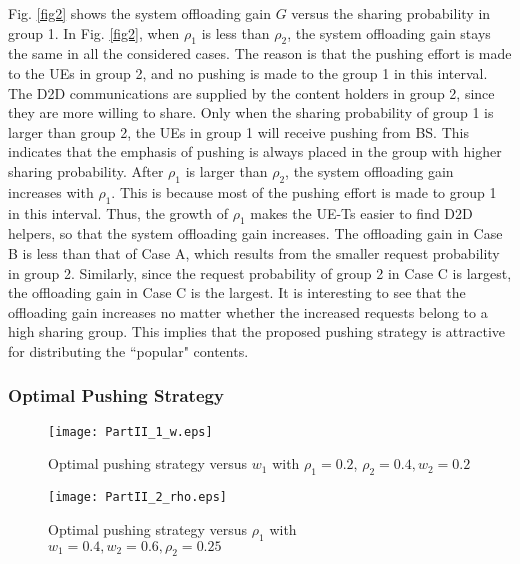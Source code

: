 \documentclass[12pt, draftclsnofoot, onecolumn]{IEEEtran}
\begin{document}
Fig. \ref{fig2} shows the system offloading gain $G$ versus the sharing probability in group 1. In Fig. \ref{fig2}, when $\rho_1$ is less than $\rho_2$, the system offloading gain stays the same in all the considered cases. The reason is that the pushing effort is made to the UEs in group 2, and no pushing is made to the group 1 in this interval. The D2D communications are supplied by the content holders in group 2, since they are more willing to share. Only when the sharing probability of group 1 is larger than group 2, the UEs in group 1 will receive pushing from BS. This indicates that the emphasis of pushing is always placed in the group with higher sharing probability. After $\rho_1$ is larger than $\rho_2$, the system offloading gain increases with $\rho_1$. This is because most of the pushing effort is made to group 1 in this interval. Thus, the growth of $\rho_1$ makes the UE-Ts easier to find D2D helpers, so that the system offloading gain increases.
The offloading gain in Case B is less than that of Case A, which results from the smaller request probability in group 2. Similarly, since the request probability of group 2 in Case C is largest, the offloading gain in Case C is the largest. It is interesting to see that the offloading gain increases no matter whether the increased requests belong to a high sharing group. This implies that the proposed pushing strategy is attractive for distributing the ``popular" contents.

\subsubsection{Optimal Pushing Strategy}

\begin{figure}
\begin{minipage}[t]{0.5\textwidth}
\centering
\texttt{[image: PartII\_1\_w.eps]}
\caption{Optimal pushing strategy versus $w_1$ with $\rho_1\!\!=\!\!0.2$,  $\rho_2 = 0.4,w_2 = 0.2$}
\label{fig3}
\end{minipage}
\begin{minipage}[t]{0.5\textwidth}
\centering
\texttt{[image: PartII\_2\_rho.eps]}
\caption{Optimal pushing strategy versus $\rho_1$ with $w_1=0.4,w_2 = 0.6,\rho_2 = 0.25$}
\label{fig4}
\end{minipage}
\end{figure}

%
\end{document}
